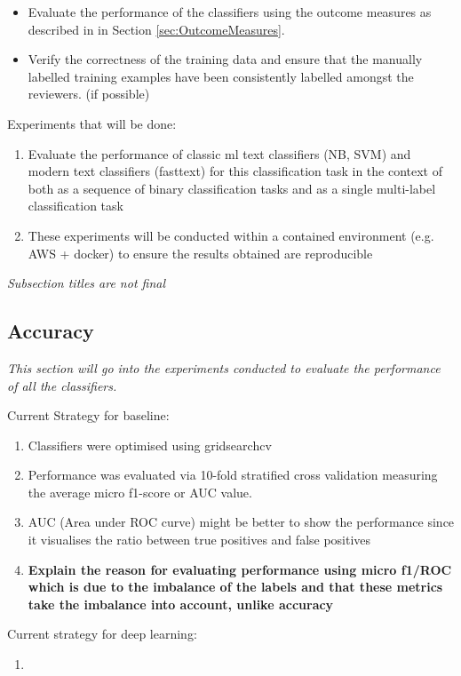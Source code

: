 \documentclass[a4paper,twoside,phd]{BYUPhys}
\begin{document}
\begin{itemize}
	\item Evaluate the performance of the classifiers using the outcome measures as described in in Section \ref{sec:OutcomeMeasures}.
	\item Verify the correctness of the training data and ensure that the manually labelled training examples have been consistently labelled amongst the reviewers. (if possible)
\end{itemize} 


Experiments that will be done:
\begin{enumerate}[-]
	\item Evaluate the performance of classic ml text classifiers (NB, SVM) and modern text classifiers (fasttext) for this classification task in the context of both as a sequence of binary classification tasks and as a single multi-label classification task
	\item These experiments will be conducted within a contained environment (e.g. AWS + docker) to ensure the results obtained are reproducible 
\end{enumerate}

\textit{Subsection titles are not final}
\subsection{Accuracy}
\label{sec:AccuracyExperiments}
\textit{This section will go into the experiments conducted to evaluate the performance of all the classifiers.}

Current Strategy for baseline:
\begin{enumerate}[-]
	\item Classifiers were optimised using gridsearchcv
	\item Performance was evaluated via 10-fold stratified cross validation measuring the average micro f1-score or AUC value.
	\item AUC (Area under ROC curve) might be better to show the performance since it visualises the ratio between true positives and false positives
	\item \textbf{Explain the reason for evaluating performance using micro f1/ROC which is due to the imbalance of the labels and that these metrics take the imbalance into account, unlike accuracy}
\end{enumerate}

Current strategy for deep learning:
\begin{enumerate}[-]
	\item 
\end{enumerate}
\end{document}
